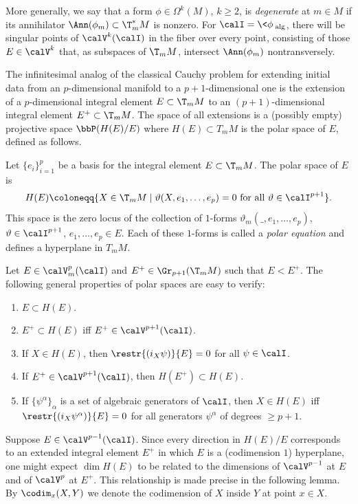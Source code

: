 More generally, we say that a form $\phi\in\Omega^k(M)$, $k\geq 2$, is \emph{degenerate} at $m\in M$ if its annihilator $\Ann(\phi_m)\subset \T_m^\ast M$ is nonzero. For $\calI=\<\phi\>_{\mathrm{alg}}$, there will be singular points of $\calV^k(\calI)$ in the fiber over every point, consisting of those $E\in\calV^k$ that, as subspaces of $\T_m M$, intersect $\Ann(\phi_m)$ nontransversely.


The infinitesimal analog of the classical Cauchy problem for extending initial data from an $p$-dimensional manifold to a $p+1$-dimensional one is the extension of a $p$-dimensional integral element $E\subset \T_m M$ to an $(p+1)$-dimensional integral element $E^+\subset \T_m M$. The space of all extensions is a (possibly empty) projective space $\bbP(H(E)\slash E)$ where $H(E)\subset T_m M$ is the polar space of $E$, defined as follows.

\begin{defn}
    Let $\{e_i\}_{i=1}^p$ be a basis for the integral element $E\subset \T_m M$. The polar space of $E$ is  
    \[H(E)\coloneqq \{X\in\T_m M\mid \vartheta(X,e_1,\ldots,e_p)=0\text{ for all }\vartheta\in\calI^{p+1}\}.\]
    This space is the zero locus of the collection of $1$-forms $\vartheta_m(\_,e_1,\ldots,e_p)$, $\vartheta\in\calI^{p+1}$, $e_1,\ldots,e_p\in E$. Each of these $1$-forms is called a \emph{polar equation} and defines a hyperplane in $T_m M$.
\end{defn}

Let $E\in\calV^p_m(\calI)$ and $E^+\in\Gr_{p+1}(\T_m M)$ such that $E<E^+$. The following general properties of polar spaces are easy to verify:
\begin{enumerate}
    \item $E\subset H(E)$.
    \item $E^+\subset H(E)$ iff $E^+\in \calV^{p+1}(\calI)$.
    \item If $X\in H(E)$, then $\restr{(i_X \psi)}{E}=0$ for all $\psi\in\calI$.
    \item If $E^+\in\calV^{p+1}(\calI)$, then $H(E^+)\subset H(E)$.
    \item If $\{\psi^\alpha\}_\alpha$ is a set of algebraic generators of $\calI$, then $X\in H(E)$ iff $\restr{(i_X\psi^\alpha)}{E}=0$ for all generators $\psi^\alpha$ of degrees $\geq p+1$.
\end{enumerate}


Suppose $E\in\calV^{p-1}(\calI)$. Since every direction in $H(E)\slash E$ corresponds to an extended integral element $E^+$ in which $E$ is a (codimension $1$) hyperplane, one might expect $\dim H(E)$ to be related to the dimensions of $\calV^{p-1}$ at $E$ and of $\calV^p$ at $E^+$. This relationship is made precise in the following lemma. By $\codim_x(X,Y)$ we denote the codimension of $X$ inside $Y$ at point $x\in X$.


